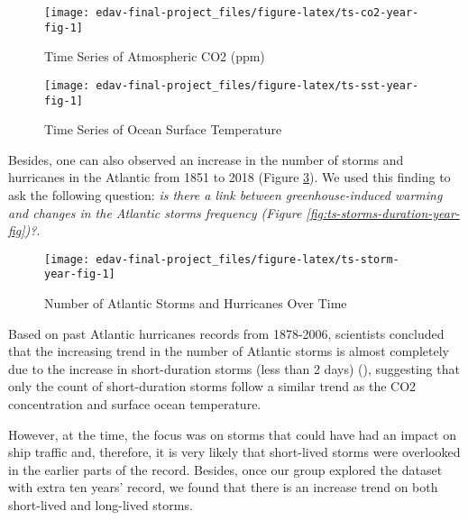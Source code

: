 \documentclass[]{book}
\begin{document}
\begin{figure}

{\centering \texttt{[image: edav-final-project\_files/figure-latex/ts-co2-year-fig-1]} 

}

\caption{Time Series of Atmospheric CO2 (ppm)}\label{fig:ts-co2-year-fig}
\end{figure}

\begin{figure}

{\centering \texttt{[image: edav-final-project\_files/figure-latex/ts-sst-year-fig-1]} 

}

\caption{Time Series of Ocean Surface Temperature}\label{fig:ts-sst-year-fig}
\end{figure}

Besides, one can also observed an increase in the number of storms and hurricanes in the Atlantic from 1851 to 2018 (Figure \ref{fig:ts-storm-year-fig}). We used this finding to ask the following question: \emph{is there a link between greenhouse-induced warming and changes in the Atlantic storms frequency (Figure \ref{fig:ts-storms-duration-year-fig})?}.

\begin{figure}

{\centering \texttt{[image: edav-final-project\_files/figure-latex/ts-storm-year-fig-1]} 

}

\caption{Number of Atlantic Storms and Hurricanes Over Time}\label{fig:ts-storm-year-fig}
\end{figure}

Based on past Atlantic hurricanes records from 1878-2006, scientists concluded that the increasing trend in the number of Atlantic storms is almost completely due to the increase in short-duration storms (less than 2 days) (\citet{Landsea2010}), suggesting that only the count of short-duration storms follow a similar trend as the CO2 concentration and surface ocean temperature.

However, at the time, the focus was on storms that could have had an impact on ship traffic and, therefore, it is very likely that short-lived storms were overlooked in the earlier parts of the record. Besides, once our group explored the dataset with extra ten years' record, we found that there is an increase trend on both short-lived and long-lived storms.
\end{document}
